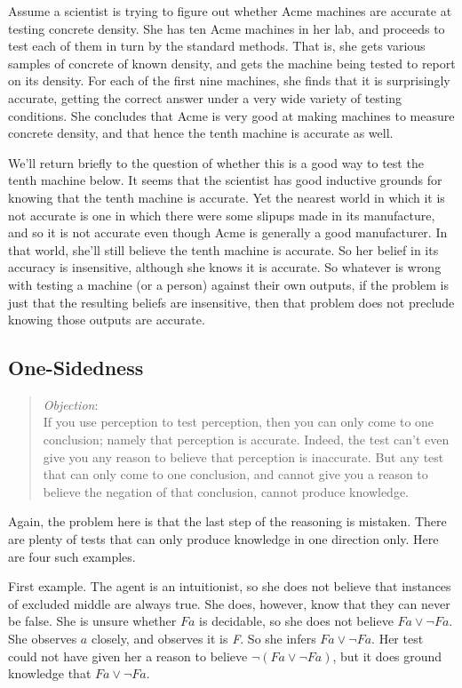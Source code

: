 Assume a scientist is trying to figure out whether Acme machines are accurate at testing concrete density. She has ten Acme machines in her lab, and proceeds to test each of them in turn by the standard methods. That is, she gets various samples of concrete of known density, and gets the machine being tested to report on its density. For each of the first nine machines, she finds that it is surprisingly accurate, getting the correct answer under a very wide variety of testing conditions. She concludes that Acme is very good at making machines to measure concrete density, and that hence the tenth machine is accurate as well.

We'll return briefly to the question of whether this is a good way to test the tenth machine below. It seems that the scientist has good inductive grounds for knowing that the tenth machine is accurate. Yet the nearest world in which it is not accurate is one in which there were some slipups made in its manufacture, and so it is not accurate even though Acme is generally a good manufacturer. In that world, she'll still believe the tenth machine is accurate. So her belief in its accuracy is insensitive, although she knows it is accurate. So whatever is wrong with testing a machine (or a person) against their own outputs, if the problem is just that the resulting beliefs are insensitive, then that problem does not preclude knowing those outputs are accurate.

\subsection{One-Sidedness}
\label{one-sidedness}

\begin{quote}
\emph{Objection}:\\
If you use perception to test perception, then you can only come to one conclusion; namely that perception is accurate. Indeed, the test can't even give you any reason to believe that perception is inaccurate. But any test that can only come to one conclusion, and cannot give you a reason to believe the negation of that conclusion, cannot produce knowledge.
\end{quote}
Again, the problem here is that the last step of the reasoning is mistaken. There are plenty of tests that can only produce knowledge in one direction only. Here are four such examples.

First example. The agent is an intuitionist, so she does not believe that instances of excluded middle are always true. She does, however, know that they can never be false. She is unsure whether $Fa$ is decidable, so she does not believe $Fa \vee \neg Fa$. She observes $a$ closely, and observes it is \emph{F}. So she infers $Fa \vee \neg Fa$. Her test could not have given her a reason to believe $\neg(Fa \vee \neg Fa)$, but it does ground knowledge that $Fa \vee \neg Fa$.

